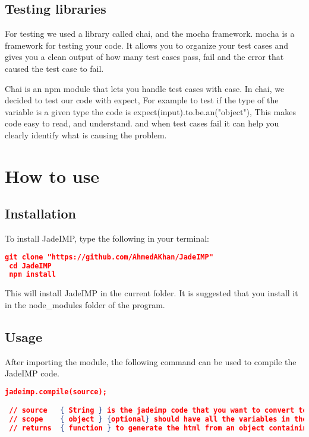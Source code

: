 \documentclass{article}
\begin{document}
\subsection{Testing libraries}

For testing we used a library called chai, and the mocha framework. mocha is a framework for testing your code. It allows you to organize your test cases and gives you a clean output of how many test cases pass, fail and the error that caused the test case to fail.

Chai is an npm module that lets you handle test cases with ease. In chai, we decided to test our code with expect, For example to test if the type of the variable is a given type the code is expect(input).to.be.an("object"), This makes code easy to read, and understand. and when test cases fail it can help you clearly identify what is causing the problem.

\section{How to use}

\subsection{Installation}
To install JadeIMP, type the following in your terminal:

\begin{lstlisting}[language=json,firstnumber=1]
 git clone "https://github.com/AhmedAKhan/JadeIMP"
 cd JadeIMP
 npm install
\end{lstlisting}

This will install JadeIMP in the current folder. It is suggested that you install it in the node\_modules folder of the program.

\subsection{Usage}
After importing the module, the following command can be used to compile the JadeIMP code.

\begin{lstlisting}[language=json,firstnumber=1]
 jadeimp.compile(source);

 // source   { String } is the jadeimp code that you want to convert to html
 // scope    { object } {optional} should have all the variables in the jade code that is defined
 // returns  { function } to generate the html from an object containing scope
\end{lstlisting}
\end{document}
